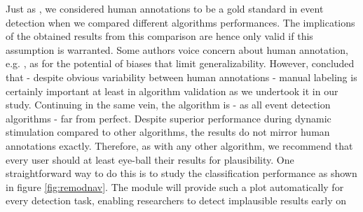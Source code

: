 Just as \cite{Andersson2017}, we considered human annotations to be a gold standard in event detection when we
compared different algorithms performances. The implications of the obtained results from this comparison are hence
only valid if this assumption is warranted. Some authors voice concern about human annotation, e.g. \cite{5523936},
as for the potential of biases that limit generalizability. However, \cite{Hooge2018} concluded that - despite
obvious variability between human annotations - manual labeling is certainly important at least in algorithm
validation as we undertook it in our study. Continuing in the same vein, the \remodnav algorithm is - as all event
detection algorithms - far from perfect. Despite superior performance during dynamic stimulation compared to other
algorithms, the results do not mirror human annotations exactly. Therefore, as with any other algorithm, we recommend
that every user should at least eye-ball their results for plausibility. One straightforward way to do this is to
study the classification performance as shown in figure \ref{fig:remodnav}. The \remodnav module will provide such a
plot automatically for every detection task, enabling researchers to detect implausible results early on






